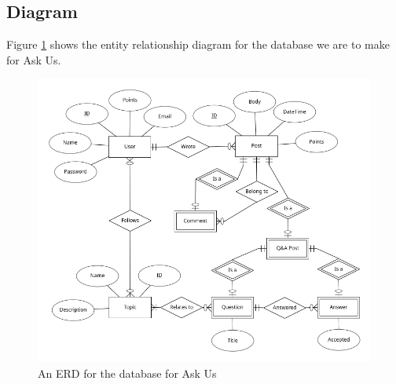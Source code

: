 \subsection{Diagram}

Figure \ref{erd} shows the entity relationship diagram for the database we are to make for Ask Us.

\begin{figure}[htb]
	\centering
	\includegraphics[width=\linewidth]{../../ERD/erd.png}
	\caption{An ERD for the database for Ask Us}
	\label{erd}
\end{figure}
